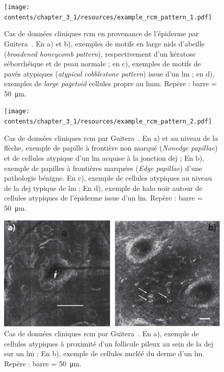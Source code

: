\begin{figure}[H]
    \begin{center}
        \texttt{[image: contents/chapter\_3\_1/resources/example\_rcm\_pattern\_1.pdf]}
        \caption{Cas de données cliniques \gls{rcm} en provenance de l'épiderme par Guitera~\cite{Guitera2010}. En a) et b), exemples de motifs en large nids d'abeille (\textit{broadened honeycomb pattern}), respectivement d'un kératose séborrhéique et de peau normale ; en c), exemples de motifs de pavés atypiques (\textit{atypical cobblestone pattern}) issue d'un \gls{lm} ; en d), exemples de \textit{large pagetoid} cellules propre au \gls{lmm}. Repère : barre = \SI{50}{\micro\metre}.}
        \label{fig:example_rcm_pattern_1}
    \end{center} 
\end{figure}\par

\begin{figure}[H]
    \begin{center}
        \texttt{[image: contents/chapter\_3\_1/resources/example\_rcm\_pattern\_2.pdf]}
        \caption{Cas de données cliniques \gls{rcm} par Guitera~\cite{Guitera2010}. En a) et au niveau de la flèche, exemple de papille à frontière non marqué (\textit{Nonedge papillae}) et de cellules atypique d'un \gls{lm} acquise à la jonction \gls{dej} ; En b), exemple de papilles à frontières marquées (\textit{Edge papillae}) d'une pathologie bénigne. En c), exemple de cellules atypiques au niveau de la \gls{dej} typique de \gls{lm} ; En d), exemple de halo noir autour de cellules atypiques de l'épiderme issue d'un \gls{lm}. Repère : barre = \SI{50}{\micro\metre}.}
        \label{fig:example_rcm_pattern_2}
    \end{center} 
\end{figure}\par

\begin{figure}[H]
    \begin{center}
        \includegraphics[width=0.8 \linewidth]{contents/chapter_3_1/resources/example_rcm_pattern_3.pdf}
        \caption{Cas de données cliniques \gls{rcm} par Guitera~\cite{Guitera2010}. En a), exemple de cellules atypiques à proximité d'un follicule pileux au sein de la \gls{dej} sur un \gls{lm} ; En b), exemple de cellules nucléé du derme d'un \gls{lm}. Repère : barre = \SI{50}{\micro\metre}.}
        \label{fig:example_rcm_pattern_3}
    \end{center} 
\end{figure}\par

